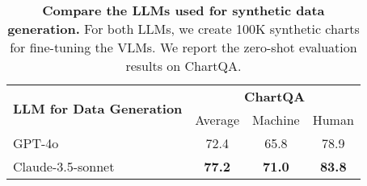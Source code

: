 \begin{table}[H]
    \small
    \centering
    \setlength{\tabcolsep}{4pt}
    \begin{tabular}{lccc}
        \toprule
        \multirow{2}{*}{\textbf{LLM for Data Generation}} & \multicolumn{3}{c}{\textbf{ChartQA}} \\ \cmidrule{2-4}
        & Average & Machine & Human \\
        \midrule
        GPT-4o & 72.4 & 65.8 & 78.9 \\ 
        Claude-3.5-sonnet & \textbf{77.2} & \textbf{71.0} & \textbf{83.8} \\
        \bottomrule
    \end{tabular}
    \vspace{-.1cm}
    \caption{\textbf{Compare the LLMs used for synthetic data generation.} For both LLMs, we create 100K synthetic charts for fine-tuning the VLMs. We report the zero-shot evaluation results on ChartQA.}
    \label{tab:llm_ablate}
    \vspace{-.3cm}
\end{table}
